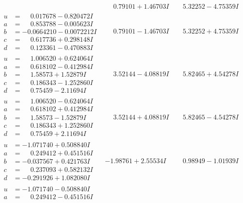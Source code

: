 \documentclass[1p]{elsarticle_modified}
\theoremstyle{definition}
\begin{document}
$$\begin{array}{c|c|c}
 & \phantom{-}0.79101 + 1.46703 I & \phantom{-}5.32252 - 4.75359 I \\ \hline\begin{aligned}
u &= \phantom{-}0.017678 - 0.820472 I \\
a &= \phantom{-}0.853788 - 0.005623 I \\
b &= -0.0664210 - 0.0072212 I \\
c &= \phantom{-}0.617736 + 0.298148 I \\
d &= \phantom{-}0.123361 - 0.470883 I\end{aligned}
 & \phantom{-}0.79101 - 1.46703 I & \phantom{-}5.32252 + 4.75359 I \\ \hline\begin{aligned}
u &= \phantom{-}1.006520 + 0.624064 I \\
a &= \phantom{-}0.618102 - 0.412984 I \\
b &= \phantom{-}1.58573 + 1.52879 I \\
c &= \phantom{-}0.186343 - 1.252860 I \\
d &= \phantom{-}0.75459 - 2.11694 I\end{aligned}
 & \phantom{-}3.52144 - 4.08819 I & \phantom{-}5.82465 + 4.54278 I \\ \hline\begin{aligned}
u &= \phantom{-}1.006520 - 0.624064 I \\
a &= \phantom{-}0.618102 + 0.412984 I \\
b &= \phantom{-}1.58573 - 1.52879 I \\
c &= \phantom{-}0.186343 + 1.252860 I \\
d &= \phantom{-}0.75459 + 2.11694 I\end{aligned}
 & \phantom{-}3.52144 + 4.08819 I & \phantom{-}5.82465 - 4.54278 I \\ \hline\begin{aligned}
u &= -1.071740 + 0.508840 I \\
a &= \phantom{-}0.249412 + 0.451516 I \\
b &= -0.037567 + 0.421763 I \\
c &= \phantom{-}0.237093 + 0.582132 I \\
d &= -0.291926 + 1.082080 I\end{aligned}
 & -1.98761 + 2.55534 I & \phantom{-}0.98949 - 1.01939 I \\ \hline\begin{aligned}
u &= -1.071740 - 0.508840 I \\
a &= \phantom{-}0.249412 - 0.451516 I \\

\end{aligned}
\end{array}$$
\end{document}
